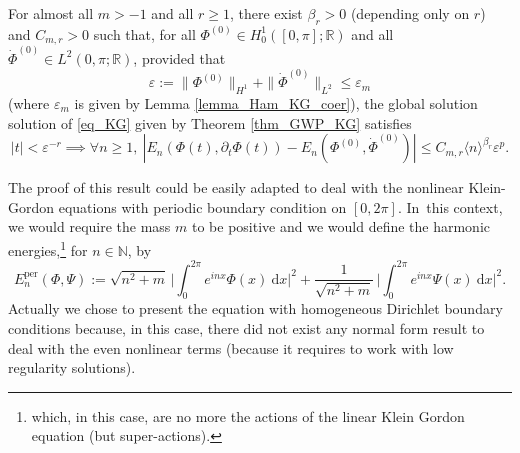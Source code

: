 \begin{theorem}
\label{thm_main_KG}
For almost all $m>-1$ and all $r\geq 1$, there exist $\beta_r>0$ (depen\-ding only on $r$) and $C_{m,r}>0$ such that, for all
$\Phi^{(0)} \in H^1_0([0,\pi];\mathbb{R})$ and all $\dot{\Phi}^{(0)} \in L^2(0,\pi;\mathbb{R})$, provided that
\[
\varepsilon:=\|\Phi^{(0)}\|_{H^1} +\|\dot{\Phi}^{(0)}\|_{ L^2} \leq \varepsilon_m
\]
(where $\varepsilon_m$ is given by Lemma \ref{lemma_Ham_KG_coer}), the global solution solution of \eqref{eq_KG} given by Theorem \ref{thm_GWP_KG} satisfies
\[
|t|< \varepsilon^{-r} \implies \forall n\geq 1, \ |E_n(\Phi(t),\partial_t \Phi(t)) - E_n(\Phi^{(0)},\dot{\Phi}^{(0)})| \leq C_{m,r} \langle n \rangle^{\beta_r} \varepsilon^{p}.
\]
\end{theorem}
\begin{remark}\label{rem_KG_per} The proof of this result could be easily adapted to deal with the nonlinear Klein-Gordon equations with periodic boundary condition on $[0,2\pi]$. In~this context, we would require the mass $m$ to be positive and we would define the harmonic energies,\footnote{which, in this case, are no more the actions of the linear Klein Gordon equation (but super-actions).} for $n\in \mathbb{N}$, by
\begin{equation*}
E_n^{\mathrm{per}}(\Phi,\Psi):= \sqrt{n^2+m}\, \biggl| \int_0^{2\pi} e^{inx} \Phi(x) \ \mathrm{d}x \biggr|^2+ \frac1{\sqrt{n^2+m}}\, \biggl| \int_0^{2\pi} e^{inx} \Psi(x) \ \mathrm{d}x \biggr|^2.
\end{equation*}
Actually we chose to present the equation with homogeneous Dirichlet boundary conditions because, in this case, there did not exist any normal form result to deal with the even nonlinear terms (because it requires to work with low regularity solutions).
\end{remark}


